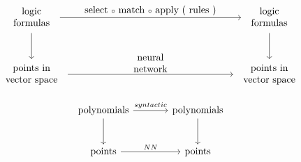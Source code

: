 \begin{equation}
\begin{tikzcd}[column sep = 17em, row sep = large]
\begin{tabular}{c}logic\\formulas\end{tabular} \arrow[r, "select $\circ$ match $\circ$ apply ( rules )", align=center] \arrow[d, swap, ""]
& \begin{tabular}{c}logic\\formulas\end{tabular} \arrow[d, ""] \\
\begin{tabular}{c}points in\\vector space\end{tabular} \arrow[r, "neural\\network", align=center] & \begin{tabular}{c}points in\\vector space\end{tabular}
\end{tikzcd}
\end{equation}

\begin{equation}
\begin{tikzcd}[column sep = large, row sep = large]
\mbox{polynomials} \arrow[r, "syntactic"] \arrow[d, swap, ""]
& \mbox{polynomials} \arrow[d, ""] \\
\mbox{points} \arrow[r, "NN"] & \mbox{points}
\end{tikzcd}
\end{equation}

